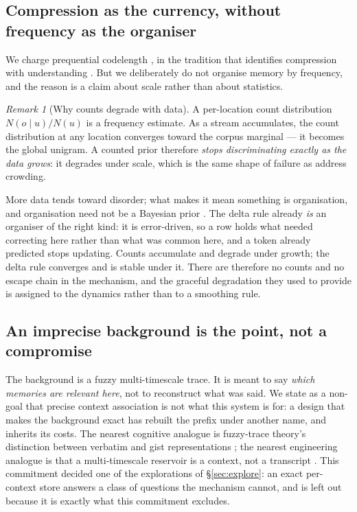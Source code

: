 \documentclass[11pt,a4paper]{article}
\theoremstyle{plain}
\theoremstyle{definition}
\theoremstyle{remark}
\newtheorem{remark}{Remark}
\begin{document}
\subsection{Compression as the currency, without frequency as the organiser}
\label{sec:compression}

We charge prequential codelength \citep{dawid1984present,rissanen1978modeling,%
blier2018description}, in the tradition that identifies compression with
understanding \citep{solomonoff1964formal,hutter2005universal}. But we
deliberately do not organise memory by frequency, and the reason is a claim
about scale rather than about statistics.

\begin{remark}[Why counts degrade with data]
A per-location count distribution $N(o\mid u)/N(u)$ is a frequency estimate.
As a stream accumulates, the count distribution at any location converges toward
the corpus marginal --- it becomes the global unigram. A counted prior therefore
\emph{stops discriminating exactly as the data grows}: it degrades under
scale, which is the same shape of failure as address crowding.
\end{remark}

More data tends toward disorder; what makes it mean something is organisation,
and organisation need not be a Bayesian prior \citep{jaynes2003probability}.
The delta rule already \emph{is} an organiser of the right kind: it is
error-driven, so a row holds what needed correcting here rather than what was
common here, and a token already predicted stops updating. Counts accumulate and
degrade under growth; the delta rule converges and is stable under it. There are
therefore no counts and no escape chain in the mechanism, and the graceful
degradation they used to provide is assigned to the dynamics rather than to a
smoothing rule.

\subsection{An imprecise background is the point, not a compromise}

The background is a fuzzy multi-timescale trace. It is meant to say \emph{which
memories are relevant here}, not to reconstruct what was said. We state as a
non-goal that precise context association is not what this system is for: a
design that makes the background exact has rebuilt the prefix under another
name, and inherits its costs. The nearest cognitive analogue is fuzzy-trace
theory's distinction between verbatim and gist representations
\citep{brainerd2002fuzzy}; the nearest engineering analogue is that a
multi-timescale reservoir is a context, not a transcript
\citep{jaeger2001echo}. This commitment decided one of the explorations of
\S\ref{sec:explore}: an exact per-context store answers a class of questions the
mechanism cannot, and is left out because it is exactly what this commitment
excludes.
\end{document}
